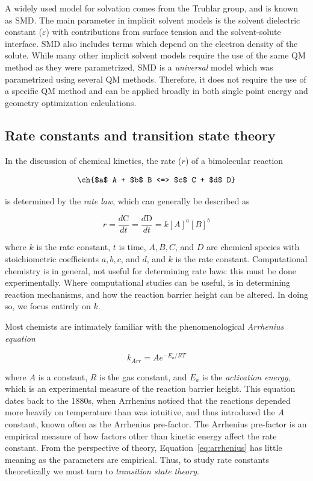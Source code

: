 A widely used model for solvation comes from the Truhlar group, and is known as SMD.\cite{Marenich2009} The main parameter in implicit solvent models is the solvent dielectric constant ($\varepsilon$) with contributions from surface tension and the solvent-solute interface. SMD also includes terms which depend on the electron density of the solute.  While many other implicit solvent models require the use of the same QM method as they were parametrized,\cite{Ho2010} SMD is a \emph{universal} model which was parametrized using several QM methods. Therefore, it does not require the use of a specific QM method and can be applied broadly in both single point energy and geometry optimization calculations.

\subsection{Rate constants and transition state theory}

In the discussion of chemical kinetics, the rate ($r$) of a bimolecular reaction

\begin{equation}
  \ch{$a$ A + $b$ B <=> $c$ C + $d$ D}
  \label{eq:a}
\end{equation}

\noindent is determined by the \emph{rate law}, which can generally be described as

\begin{equation}
  r = \frac{d \text{C}}{dt} =\frac{d \text{D}}{dt} = k[A]^a [B]^b
\end{equation}

\noindent where $k$ is the rate constant, $t$ is time, $A, B, C$, and $D$ are chemical species with stoichiometric coefficients $a, b, c$, and $d$, and $k$ is the rate constant. Computational chemistry is in general, not useful for determining rate laws: this must be done experimentally. Where computational studies can be useful, is in determining reaction mechanisms, and how the reaction barrier height can be altered. In doing so, we focus entirely on $k$.

Most chemists are intimately familiar with the phenomenological \emph{Arrhenius equation}

\begin{equation}
  k_{Arr} = Ae^{-E_a/RT}
\label{eq:arrhenius}
\end{equation}

\noindent where $A$ is a constant, $R$ is the gas constant, and $E_a$ is the \emph{activation energy}, which is an experimental measure of the reaction barrier height. This equation dates back to the 1880s, when Arrhenius noticed that the reactions depended more heavily on temperature than was intuitive, and thus introduced the $A$ constant, known often as the Arrhenius pre-factor.\cite{McQuarrie1997} The Arrhenius pre-factor is an empirical measure of how factors other than kinetic energy affect the rate constant. From the perspective of theory, Equation~\ref{eq:arrhenius} has little meaning as the parameters are empirical. Thus, to study rate constants theoretically we must turn to \emph{transition state theory}.

